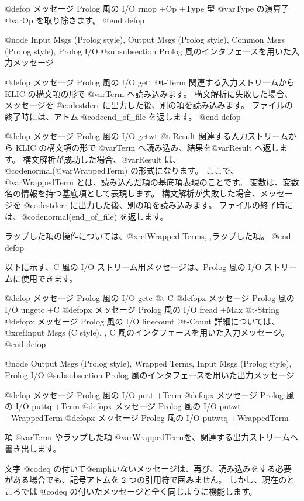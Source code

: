 {{{{@defop {メッセージ} {Prolog 風の I/O }  rmop +Op +Type
型 @var{Type} の演算子 @var{Op} を取り除きます。
@end defop

@node Input Msgs (Prolog style), Output Msgs (Prolog style), Common Msgs (Prolog style), Prolog I/O
@subsubsection Prolog 風のインタフェースを用いた入力メッセージ

@defop {メッセージ} {Prolog 風の I/O }  gett @t{-}Term
関連する入力ストリームから KLIC の構文項の形で @var{Term} へ読み込みます。
構文解析に失敗した場合、メッセージを @code{stderr} に出力した後、別の項を読み込みます。
ファイルの終了時には、アトム @code{end_of_file} を返します。
@end defop

@defop {メッセージ} {Prolog 風の I/O }  getwt @t{-}Result
関連する入力ストリームから KLIC の構文項の形で @var{Term} へ読み込み、結果を@var{Result} へ返します。
構文解析が成功した場合、@var{Result} は、@code{normal(@var{WrappedTerm}) }の形式になります。
ここで、@var{WrappedTerm} とは、読み込んだ項の基底項表現のことです。
変数は、変数名の情報を持つ基底項として表現します。
構文解析が失敗した場合、メッセージを @code{stderr} に出力した後、別の項を読み込みます。
ファイルの終了時には、@code{normal(end_of_file) }を返します。

ラップした項の操作については、@xref{Wrapped Terms, ,ラップした項}。
@end defop

以下に示す、C 風の I/O ストリーム用メッセージは、Prolog 風の I/O ストリームに使用できます。

@defop {メッセージ} {Prolog 風の I/O }  getc @t{-}C
@defopx {メッセージ} {Prolog 風の I/O }  ungetc +C
@defopx {メッセージ} {Prolog 風の I/O }  fread +Max @t{-}String
@defopx {メッセージ} {Prolog 風の I/O }  linecount @t{-}Count
詳細については、@xref{Input Msgs (C style), ,
C 風のインタフェースを用いた入力メッセージ}。
@end defop

@node Output Msgs (Prolog style), Wrapped Terms, Input Msgs (Prolog style), Prolog I/O
@subsubsection Prolog 風のインタフェースを用いた出力メッセージ

@defop  {メッセージ} {Prolog 風の I/O }  putt +Term
@defopx {メッセージ} {Prolog 風の I/O }  puttq +Term
@defopx {メッセージ} {Prolog 風の I/O }  putwt +WrappedTerm
@defopx {メッセージ} {Prolog 風の I/O }  putwtq +WrappedTerm

項 @var{Term} やラップした項 @var{WrappedTerm}を、関連する出力ストリームへ書き出します。

文字 @code{q} の付いて@emph{いない}メッセージは、再び、読み込みをする必要がある場合でも、記号アトムを 2 つの引用符で囲みません。
しかし、現在のところでは @code{q} の付いたメッセージと全く同じように機能します。

}}}}
